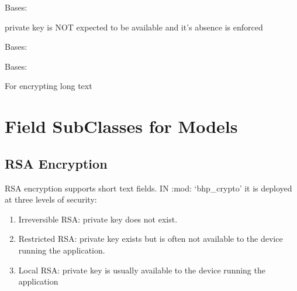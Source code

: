 \documentclass[letterpaper,10pt,english]{sphinxmanual}
\begin{document}

\begin{fulllineitems}
\label{field_classes:bhp_crypto.fields.RestrictedRsaEncryptionField}
Bases: 

private key is NOT expected to be available and it's absence is enforced

\end{fulllineitems}


\begin{fulllineitems}
\label{field_classes:bhp_crypto.fields.LocalRsaEncryptionField}
Bases: 

\end{fulllineitems}


\begin{fulllineitems}
\label{field_classes:bhp_crypto.fields.LocalAesEncryptionField}
Bases: 

For encrypting long text

\end{fulllineitems}



\chapter{Field SubClasses for Models}
\label{field_subclasses:field-subclasses-for-models}\label{field_subclasses::doc}

\section{RSA Encryption}
\label{field_subclasses:rsa-encryption}
RSA encryption supports short text fields. IN :mod: `bhp\_crypto' it is deployed at three levels of security:
\begin{enumerate}
\item {} 
Irreversible RSA: private key does not exist.

\item {} 
Restricted RSA: private key exists but is often not available to the device running the application.

\item {} 
Local RSA: private key is usually available to the device running the application

\end{enumerate}
\end{document}

